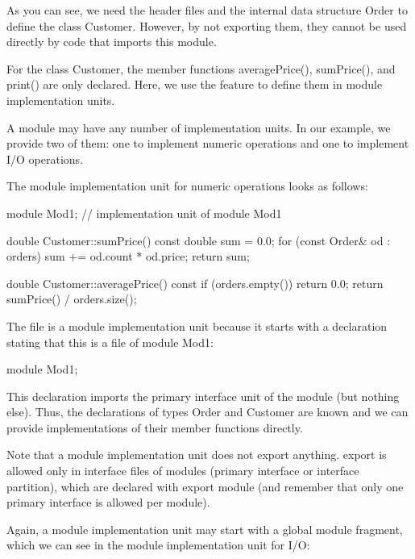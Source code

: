 As you can see, we need the header files and the internal data structure Order to define the class Customer. However, by not exporting them, they cannot be used directly by code that imports this module.

For the class Customer, the member functions averagePrice(), sumPrice(), and print() are only declared. Here, we use the feature to define them in module implementation units.


A module may have any number of implementation units. In our example, we provide two of them: one to implement numeric operations and one to implement I/O operations.

The module implementation unit for numeric operations looks as follows:


\begin{cpp}
module Mod1; // implementation unit of module Mod1

double Customer::sumPrice() const
{
	double sum = 0.0;
	for (const Order& od : orders) {
		sum += od.count * od.price;
	}
	return sum;
}

double Customer::averagePrice() const
{
	if (orders.empty()) {
		return 0.0;
	}
	return sumPrice() / orders.size();
}
\end{cpp}

The file is a module implementation unit because it starts with a declaration stating that this is a file of module Mod1:

\begin{cpp}
module Mod1;
\end{cpp}

This declaration imports the primary interface unit of the module (but nothing else). Thus, the declarations of types Order and Customer are known and we can provide implementations of their member functions directly.

Note that a module implementation unit does not export anything. export is allowed only in interface files of modules (primary interface or interface partition), which are declared with export module (and remember that only one primary interface is allowed per module).

Again, a module implementation unit may start with a global module fragment, which we can see in the module implementation unit for I/O:


